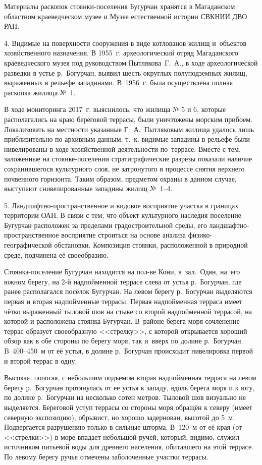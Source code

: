 Материалы раскопок стоянки-поселения Бугурчан хранятся в Магаданском областном краеведческом музее и Музее естественной истории СВКНИИ ДВО РАН.

4. Видимые на поверхности сооружения в виде котлованов жилищ и~объектов хозяйственного назначения. В 1955~г. археологический отряд Магаданского краеведческого музея под руководством Пытлякова~Г.~А., в ходе археологической разведки в устье р.~Богурчан, выявил шесть округлых полуподземных жилищ, выраженных в рельефе западинами. В~1956~г. была осуществлена полная раскопка жилища №~1.

В ходе мониторинга 2017~г. выяснилось, что жилища № 5 и 6, которые располагались на краю береговой террасы, были уничтожены морским прибоем. Локализовать на местности указанные Г.~А.~Пытляковым жилища удалось лишь приблизительно по архивным данным, т.~к. видимые западины в рельефе были нивелированы в ходе хозяйственной деятельности по~террасе. Вместе с тем, заложенные на стоянке-поселении стратиграфические разрезы показали наличие сохранившегося культурного слоя, не затронутого в процессе снятия верхнего почвенного горизонта. Таким образом, предметом охраны в данном случае, выступают снивелированные западины жилищ №~1--4.

5. Ландшафтно-пространственное и видовое восприятие участка в границах территории ОАН. В связи  с тем, что объект культурного наследия поселение Бугурчан расположен за пределами градостроительной среды, его ландшафтно-пространственное восприятие строиться на основе анализа физико-географической обстановки. Композиция стоянки, расположенной в природной среде, подчинена её своеобразию.

Стоянка-поселение Бугурчан находится на пол-ве Кони, в~зал.~Одян, на~его южном берегу, на 2-й надпойменной террасе слева от устья р.~Богурчан, где ранее располагался посёлок Бугурчан. На левом берегу р.~Богурчан выделяются первая и вторая надпойменные террасы. Первая надпойменная терраса имеет чётко выраженный тыловой шов на стыке со второй надпойменной террасой, на которой и расположена стоянка Бугурчан. В~районе берега моря сочленение террас образует своеобразную <<стрелку>>, с которой открывается хороший обзор как в обе стороны по берегу моря, так и~вверх по долине р.~Богурчан. B~400--450~м от её устья, в долине р.~Богурчан происходит нивелировка первой и второй террас в одну.

Высокая, пологая, с небольшим подъемом вторая надпойменная терраса на левом берегу р.~Богурчан протянулась от ее устья к западу, вдоль берега моря и к югу, по долине р.~Богурчан на несколько сотен метров. Тыловой шов визуально не выделяется. Береговой уступ террасы со стороны моря обращён к северу (имеет северную экспозицию), обрывист, но хорошо задернован, высотой до 5~м. Подвергается разрушению только в сильные шторма. В~120~м от её края (от <<стрелки>>) в море впадает небольшой ручей, который, видимо, служил источником питьевой воды для древнего населения, обитавшего на этой террасе. По левому берегу ручья отмечены заболоченные участки террасы.

